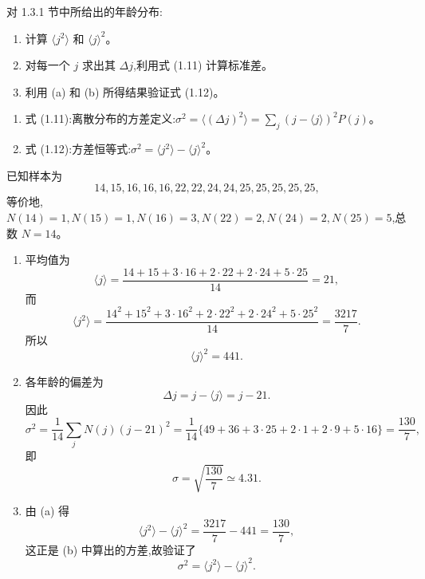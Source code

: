 \begin{question}
对 1.3.1 节中所给出的年龄分布:
\begin{enumerate}
\item 计算 $\langle j^2\rangle$ 和 $\langle j\rangle^2$。
\item 对每一个 $j$ 求出其 $\Delta j$,利用式 (1.11) 计算标准差。
\item 利用 (a) 和 (b) 所得结果验证式 (1.12)。
\end{enumerate}

\par\smallskip
{}
\begin{enumerate}[leftmargin=2.2em,itemsep=0.12em,topsep=0.12em,parsep=0pt]
\item 式 (1.11):离散分布的方差定义:$\sigma^2=\langle(\Delta j)^2\rangle=\sum_j (j-\langle j\rangle)^2P(j)$。
\item 式 (1.12):方差恒等式:$\sigma^2=\langle j^2\rangle-\langle j\rangle^2$。
\end{enumerate}

\end{question}
\begin{solution}
已知样本为
\[
14,15,16,16,16,22,22,24,24,25,25,25,25,25,
\]
等价地,$N(14)=1,N(15)=1,N(16)=3,N(22)=2,N(24)=2,N(25)=5$,总数 $N=14$。
\begin{enumerate}
\item 平均值为
\[
\langle j\rangle=\frac{14+15+3\cdot 16+2\cdot 22+2\cdot 24+5\cdot 25}{14}=21,
\]
而
\[
\langle j^2\rangle=\frac{14^2+15^2+3\cdot 16^2+2\cdot 22^2+2\cdot 24^2+5\cdot 25^2}{14}
=\frac{3217}{7}.
\]
所以
\[
\langle j\rangle^2=441.
\]
\item 各年龄的偏差为
\[
\Delta j=j-\langle j\rangle=j-21.
\]
因此
\[
\sigma^2=\frac{1}{14}\sum_j N(j)(j-21)^2
=\frac{1}{14}\{49+36+3\cdot25+2\cdot1+2\cdot9+5\cdot16\}
=\frac{130}{7},
\]
即
\[
\sigma=\sqrt{\frac{130}{7}}\simeq 4.31.
\]
\item 由 (a) 得
\[
\langle j^2\rangle-\langle j\rangle^2=\frac{3217}{7}-441=\frac{130}{7},
\]
这正是 (b) 中算出的方差,故验证了
\[
\sigma^2=\langle j^2\rangle-\langle j\rangle^2.
\]
\end{enumerate}
\end{solution}

